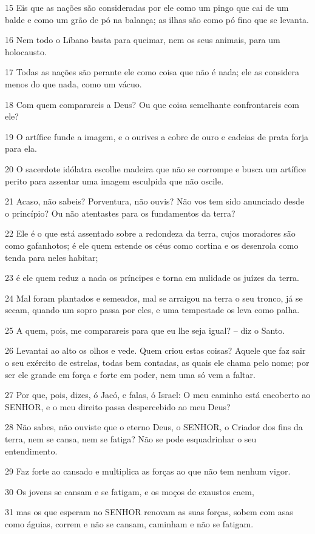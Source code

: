 \par 15 Eis que as nações são consideradas por ele como um pingo que cai de um balde e como um grão de pó na balança; as ilhas são como pó fino que se levanta.
\par 16 Nem todo o Líbano basta para queimar, nem os seus animais, para um holocausto.
\par 17 Todas as nações são perante ele como coisa que não é nada; ele as considera menos do que nada, como um vácuo.
\par 18 Com quem comparareis a Deus? Ou que coisa semelhante confrontareis com ele?
\par 19 O artífice funde a imagem, e o ourives a cobre de ouro e cadeias de prata forja para ela.
\par 20 O sacerdote idólatra escolhe madeira que não se corrompe e busca um artífice perito para assentar uma imagem esculpida que não oscile.
\par 21 Acaso, não sabeis? Porventura, não ouvis? Não vos tem sido anunciado desde o princípio? Ou não atentastes para os fundamentos da terra?
\par 22 Ele é o que está assentado sobre a redondeza da terra, cujos moradores são como gafanhotos; é ele quem estende os céus como cortina e os desenrola como tenda para neles habitar;
\par 23 é ele quem reduz a nada os príncipes e torna em nulidade os juízes da terra.
\par 24 Mal foram plantados e semeados, mal se arraigou na terra o seu tronco, já se secam, quando um sopro passa por eles, e uma tempestade os leva como palha.
\par 25 A quem, pois, me comparareis para que eu lhe seja igual? -- diz o Santo.
\par 26 Levantai ao alto os olhos e vede. Quem criou estas coisas? Aquele que faz sair o seu exército de estrelas, todas bem contadas, as quais ele chama pelo nome; por ser ele grande em força e forte em poder, nem uma só vem a faltar.
\par 27 Por que, pois, dizes, ó Jacó, e falas, ó Israel: O meu caminho está encoberto ao SENHOR, e o meu direito passa despercebido ao meu Deus?
\par 28 Não sabes, não ouviste que o eterno Deus, o SENHOR, o Criador dos fins da terra, nem se cansa, nem se fatiga? Não se pode esquadrinhar o seu entendimento.
\par 29 Faz forte ao cansado e multiplica as forças ao que não tem nenhum vigor.
\par 30 Os jovens se cansam e se fatigam, e os moços de exaustos caem,
\par 31 mas os que esperam no SENHOR renovam as suas forças, sobem com asas como águias, correm e não se cansam, caminham e não se fatigam.

